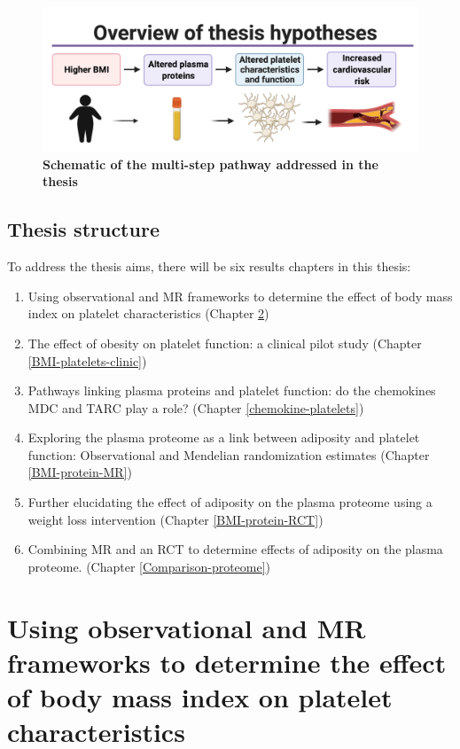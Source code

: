\documentclass[11pt,twoside]{bristolthesis}
\providecommand{\tightlist}{%
  \setlength{\itemsep}{0pt}\setlength{\parskip}{0pt}}
\begin{document}
\begin{figure}
\includegraphics{figure/Intro_background/Thesis_graphic_overview_without_chapters} \caption[Schematic of the multi-step pathway addressed in the thesis]{\textbf{Schematic of the multi-step pathway addressed in the thesis}}\label{fig:Thesis-schematic}
\end{figure}
\hypertarget{thesis-structure}{%
\section{Thesis structure}\label{thesis-structure}}

To address the thesis aims, there will be six results chapters in this thesis:
\begin{enumerate}
\def\labelenumi{\arabic{enumi})}
\tightlist
\item
  Using observational and MR frameworks to determine the effect of body mass index on platelet characteristics (Chapter \ref{BMI-platelets-INTERVAL})
\item
  The effect of obesity on platelet function: a clinical pilot study (Chapter \ref{BMI-platelets-clinic})
\item
  Pathways linking plasma proteins and platelet function: do the chemokines MDC and TARC play a role? (Chapter \ref{chemokine-platelets})
\item
  Exploring the plasma proteome as a link between adiposity and platelet function: Observational and Mendelian randomization estimates (Chapter \ref{BMI-protein-MR})
\item
  Further elucidating the effect of adiposity on the plasma proteome using a weight loss intervention (Chapter \ref{BMI-protein-RCT})
\item
  Combining MR and an RCT to determine effects of adiposity on the plasma proteome. (Chapter \ref{Comparison-proteome})
\end{enumerate}
\hypertarget{BMI-platelets-INTERVAL}{%
\chapter{Using observational and MR frameworks to determine the effect of body mass index on platelet characteristics}\label{BMI-platelets-INTERVAL}}
\end{document}
